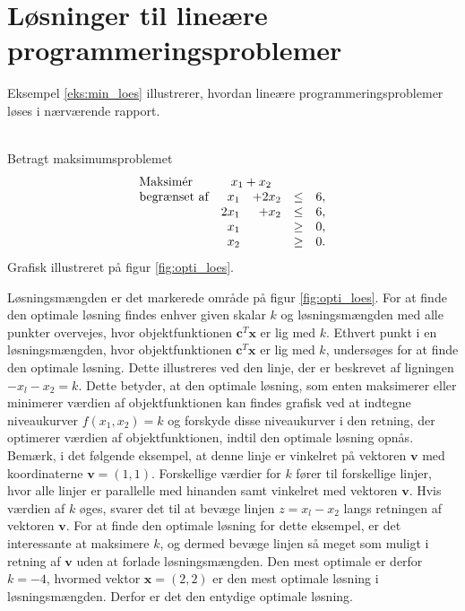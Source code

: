 \section{Løsninger til lineære programmeringsproblemer}
%
\label{heeeeejjulle}
Eksempel \ref{eks:min_loes} illustrerer, hvordan lineære programmeringsproblemer løses i nærværende rapport.
\\\\
\begin{eks}\label{eks:min_loes}
Betragt maksimumsproblemet
%
\begin{align*}
\begin{array}{lrrlr}
\text{Maksimér}		&	\multicolumn{2}{c}{x_1+x_2}  &\\
\text{begrænset af}	&x_1& + 2x_2			&\leq 	& 6,\\
					&2x_1& + x_2			&\leq	& 6,\\
					&x_1&    				&\geq	& 0,\\
					&x_2&    				&\geq	& 0.\\
\end{array}
\end{align*}
%
Grafisk illustreret på figur \ref{fig:opti_loes}.
%

%
\noindent
Løsningsmængden er det markerede område på figur \ref{fig:opti_loes}. 
For at finde den optimale løsning findes enhver given skalar $k$ og løsningsmængden med alle punkter overvejes, hvor objektfunktionen $\textbf{c}^T\textbf{x}$ er lig med $k$. 
Ethvert punkt i en løsningsmængden, hvor objektfunktionen $\textbf{c}^T\textbf{x}$ er lig med $k$, undersøges for at finde den optimale løsning.
Dette illustreres ved den linje, der er beskrevet af ligningen $-x_l-x_2=k$. 
Dette betyder, at den optimale løsning, som enten maksimerer eller minimerer værdien af objektfunktionen kan findes grafisk ved at indtegne niveaukurver $f(x_1, x_2)=k$ og forskyde disse niveaukurver i den retning, der optimerer værdien af objektfunktionen, indtil den optimale løsning opnås.  
Bemærk, i det følgende eksempel, at denne linje er vinkelret på vektoren $\textbf{v}$ med koordinaterne $\textbf{v}=(1,1)$.
Forskellige værdier for $k$ fører til forskellige linjer, hvor  alle linjer er parallelle med hinanden samt vinkelret med vektoren $\textbf{v}$. Hvis værdien af $k$ øges, svarer det til at bevæge linjen $z=x_l-x_2$ langs retningen af vektoren $\textbf{v}$. For at finde den optimale løsning for dette eksempel, er det interessante at maksimere $k$, og dermed bevæge linjen så meget som muligt i retning af $\textbf{v}$ uden at forlade løsningsmængden. Den mest optimale er derfor $k = -4$, hvormed vektor $\textbf{x}=(2,2)$ er den mest optimale løsning i løsningsmængden. Derfor er det den entydige optimale løsning. 

\end{eks}
